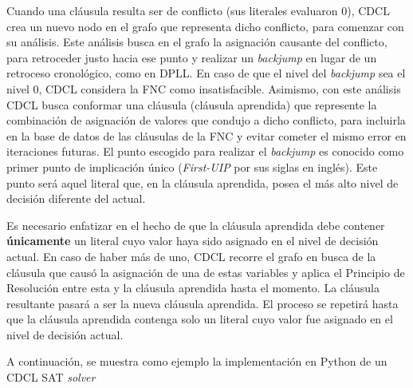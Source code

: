 Cuando una cl\'ausula resulta ser de conflicto (sus literales evaluaron 0), CDCL crea un nuevo nodo en el grafo que representa dicho conflicto, para comenzar con su an\'alisis. Este an\'alisis busca en el grafo la asignaci\'on causante del conflicto, para retroceder justo hacia ese punto y realizar un \textit{backjump} en lugar de un retroceso cronol\'ogico, como en DPLL. En caso de que el nivel del \textit{backjump} sea el nivel 0, CDCL considera la FNC como insatisfacible. Asimismo, con este an\'alisis CDCL busca conformar una cl\'ausula (cl\'ausula aprendida) que represente la combinaci\'on de asignaci\'on de valores que condujo a dicho conflicto, para incluirla en la base de datos de las cl\'ausulas de la FNC y evitar cometer el mismo error en iteraciones futuras. El punto escogido para realizar el \textit{backjump} es conocido como primer punto de implicaci\'on \'unico (\textit{First-UIP} por sus siglas en ingl\'es). Este punto ser\'a aquel literal que, en la cl\'ausula aprendida, posea el m\'as alto nivel de decisi\'on diferente del actual.

Es necesario enfatizar en el hecho de que la cl\'ausula aprendida debe contener \textbf{\'unicamente} un literal cuyo valor haya sido asignado en el nivel de decisi\'on actual. En caso de haber m\'as de uno, CDCL recorre el grafo en busca de la cl\'ausula que caus\'o la asignaci\'on de una de estas variables y aplica el Principio de Resoluci\'on entre esta y la cl\'ausula aprendida hasta el momento. La cl\'ausula resultante pasar\'a a ser la nueva cl\'ausula aprendida. El proceso se repetir\'a hasta que la cl\'ausula aprendida contenga solo un literal cuyo valor fue asignado en el nivel de decisi\'on actual.

A continuación, se muestra como ejemplo la implementación en Python de un CDCL SAT \textit{solver}

